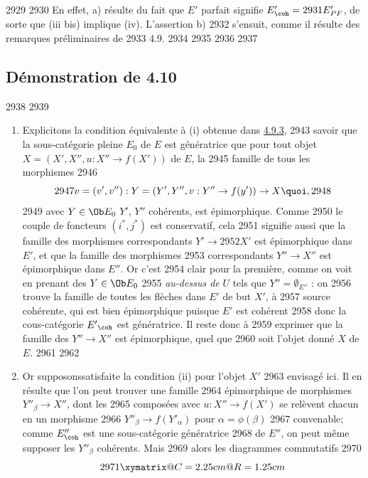   2929	
  2930	En effet, a) résulte du fait que $E'$ parfait signifie $E'_{\coh} =
  2931	E'_{PF}$, de sorte que (iii bis) implique (iv). L'assertion b)
  2932	s'ensuit, comme il résulte des remarques préliminaires de
  2933	4.9.
  2934	
  2935	
  2936	\setcounter{subsection}{11}
  2937	\subsection{Démonstration de 4.10}
  2938	
  2939	\begin{enumerate}
  2940	\renewcommand{\theenumi}{\alph{enumi}}
  2941	\renewcommand{\labelenumi}{\theenumi)}
  2942	\item Explicitons la condition équivalente à (i) obtenue dans \hyperref[VI.subsubsec4.9.3]{4.9.3},
  2943	  savoir que la sous-catégorie pleine $E_0$ de $E$ est génératrice 	  que pour tout objet $X = (X', X'', u : X''\to f(X'))$ de $E$, la
  2945	  famille de tous les morphismes
  2946	$$
  2947	v = (v', v'') : Y = (Y', Y'', v : Y''\to f(y')) \to X {\quoi},
  2948	$$
  2949	avec $Y \in \Ob E_0$ \ie $Y'$, $Y''$ cohérents, est épimorphique. Comme
  2950	le couple de foncteurs $(i^{\ast}, j^{\ast})$ est conservatif, cela
  2951	signifie aussi que la famille des morphismes correspondants $Y' \to
  2952	X'$ est épimorphique dans $E'$, et que la famille des morphismes
  2953	correspondants $Y''\to X''$ est épimorphique dans $E''$. Or c'est
  2954	clair pour la première, comme on voit en prenant des $Y \in \Ob E_0$
  2955	\emph{au-dessus de} $U$ \ie tels que $Y'' = ∅_{E''}$ : on
  2956	trouve la famille de toutes les flèches dans $E'$ de but $X'$, à
  2957	source cohérente, qui est bien épimorphique puisque $E'$ est cohérent
  2958	donc la cous-catégorie ${E'}_{\coh}$ est génératrice. Il reste donc à
  2959	exprimer que la famille des $Y''\to X''$ est épimorphique, quel que
  2960	soit l'objet donné $X$ de $E$.
  2961	
  2962	\item Or supposons\pageoriginale satisfaite la condition (ii) pour l'objet $X'$
  2963	  envisagé ici. Il en résulte que l'on peut trouver une famille
  2964	  épimorphique de morphismes $Y''_{\beta} \to X''$, dont les
  2965	  composées avec $u : X''\to f(X')$ se relèvent chacun en un morphisme
  2966	  $Y''_{\beta} \to f({Y'_{\alpha}})$ pour $\alpha = \phi(\beta)$
  2967	  convenable; comme $E''_{\coh}$ est une sous-catégorie génératrice
  2968	  de $E''$, on peut même supposer les $Y''_{\beta}$ cohérents. Mais
  2969	  alors les diagrammes commutatifs
  2970	\[
  2971	\xymatrix@C=2.25cm@R=1.25cm{
}\]
\end{enumerate}
